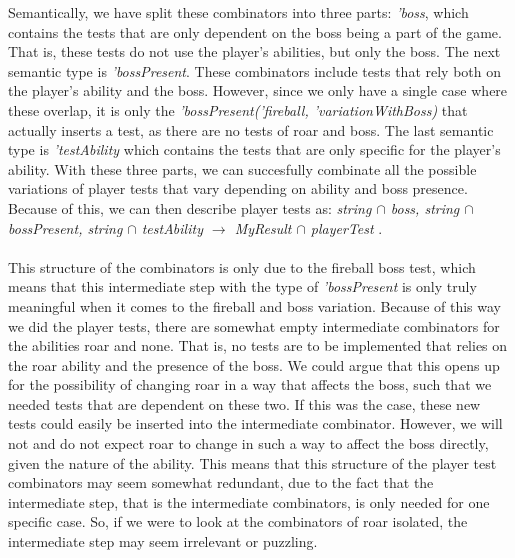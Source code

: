 Semantically, we have split these combinators into three parts: \textit{'boss}, which contains the tests that are only dependent on the boss being a part of the game. That is, these tests do not use the player's abilities, but only the boss. The next semantic type is \textit{'bossPresent}. These combinators include tests that rely both on the player's ability and the boss. However, since we only have a single case where these overlap, it is only the \textit{'bossPresent('fireball, 'variationWithBoss)} that actually inserts a test, as there are no tests of roar and boss. The last semantic type is \textit{'testAbility} which contains the tests that are only specific for the player's ability. With these three parts, we can succesfully combinate all the possible variations of player tests that vary depending on ability and boss presence. Because of this, we can then describe player tests as: \textit{string $\cap$ boss, string $\cap$ bossPresent, string $\cap$ testAbility $\to$ MyResult $\cap$ playerTest} . \\
\\
This structure of the combinators is only due to the fireball boss test, which means that this intermediate step with the type of \textit{'bossPresent} is only truly meaningful when it comes to the fireball and boss variation. Because of this way we did the player tests, there are somewhat empty intermediate combinators for the abilities roar and none. That is, no tests are to be implemented that relies on the roar ability and the presence of the boss. We could argue that this opens up for the possibility of changing roar in a way that affects the boss, such that we needed tests that are dependent on these two. If this was the case, these new tests could easily be inserted into the intermediate combinator. However, we will not and do not expect roar to change in such a way to affect the boss directly, given the nature of the ability. This means that this structure of the player test combinators may seem somewhat redundant, due to the fact that the intermediate step, that is the intermediate combinators, is only needed for one specific case. So, if we were to look at the combinators of roar isolated, the intermediate step may seem irrelevant or puzzling. 